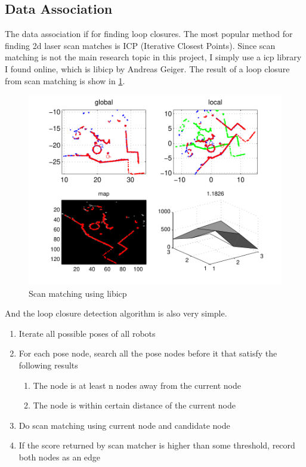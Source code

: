 \documentclass[twoside]{article}
\begin{document}
\begin{multicols}{2}
\subsection{Data Association}
The data association if for finding loop closures. The most popular method for finding 2d laser scan matches is ICP (Iterative Closest Points). Since scan matching is not the main research topic in this project, I simply use a icp library I found online, which is libicp by Andreas Geiger. The result of a loop closure from scan matching is show in \ref{fig:scan_match}.
\begin{figure}[H]
\centering
\includegraphics[width=\columnwidth]{fig/scan_match.pdf}
\caption{Scan matching using libicp}
\label{fig:scan_match}
\end{figure}
And the loop closure detection algorithm is also very simple.
\begin{enumerate}
\item Iterate all possible poses of all robots
\item For each pose node, search all the pose nodes before it that satisfy the following results
\begin{enumerate}
\item The node is at least n nodes away from the current node
\item The node is within certain distance of the current node
\end{enumerate}
\item Do scan matching using current node and candidate node
\item If the score returned by scan matcher is higher than some threshold, record both nodes as an edge

\end{enumerate}
\end{multicols}
\end{document}
